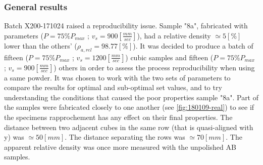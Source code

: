 \subsubsection{General results}
Batch X200-171024 raised a reproducibility issue. Sample "8a", fabricated with parameters ($P=75\% P_{max}$ ; $v_s=900 [\frac{mm}{sec}]$), had a relative density $\simeq 5 [\%]$ lower than the others' ($\rho_{a,rel}=98.77[\%]$). It was decided to produce a batch of fifteen ($P=75\% P_{max}$ ; $v_s=1200 [\frac{mm}{sec}]$) cubic samples and fifteen ($P=75\% P_{max}$ ; $v_s=900 [\frac{mm}{sec}]$) others in order to assess the process reproducibility when using a same powder. It was chosen to work with the two sets of parameters to compare the results for optimal and sub-optimal set values, and to try understanding the conditions that caused the poor properties sample "8a". Part of the samples were fabricated closely to one another (see \ref{fig:180109-real}) to see if the specimens rapprochement has any effect on their final properties. The distance between two adjacent cubes in the same row (that is quasi-aligned with y) was $\simeq 50 [mm]$. The distance separating the rows was $\simeq 70 [mm]$. The apparent relative density was once more measured with the unpolished AB samples.\\

 \begin{center}
\begin{table}[ht]
\noindent{}

\caption[Average values and standard deviations for apparent relative densities and hardnesses of the specimens of batch X200-171024]{Average values and standard deviations for apparent relative densities and hardnesses of the specimens of batch X200-171024}
\label{tab:78}
\end{table}
 \end{center}

